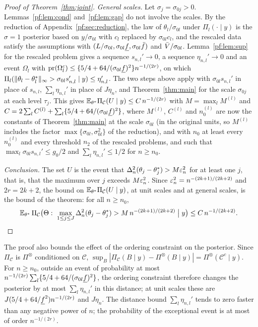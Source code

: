 \begin{proof}[Proof of Theorem~\ref{thm:joint}]
\emph{General scales.} Let $\sigma_j=\sigma_{0j}>0$. Lemmas~\ref{pf:lem:cond} and~\ref{pf:lem:gap} do not involve the scales. By the reduction of Appendix~\ref{pf:sec:reduction}, the law of $\theta_l/\sigma_{0l}$ under $\Pi_l(\cdot\mid y)$ is the $\sigma=1$ posterior based on $y/\sigma_{0l}$ with $c_l$ replaced by $\sigma_{0l}c_l$, and the rescaled data satisfy the assumptions with $(L/\sigma_{0l},\sigma_{0l}\underline f,\sigma_{0l}\bar f)$ and $\bar V/\sigma_{0l}$. Lemma~\ref{pf:lem:sup} for the rescaled problem gives a sequence $s_{n,l}'\to0$, a sequence $\eta_{n,l}'\to0$ and an event $\Omega_l$ with $\mathrm{pr}(\Omega_l^c)\le\{5/4+64/(\sigma_{0l}\underline f)^2\}n^{-1/(2r)}$, on which $\Pi_l(\|\theta_l-\theta^{*}_l\|_\infty>\sigma_{0l}s_{n,l}'\mid y)\le\eta_{n,l}'$. The two steps above apply with $\sigma_{0l}s_{n,l}'$ in place of $s_{n,l}$, $\sum_l\eta_{n,l}'$ in place of $J\eta_n$, and Theorem~\ref{thm:main} for the scale $\sigma_{0j}$ at each level $\tau_j$. This gives $\mathbb{E}_{\theta^{*}}\Pi_{\mathcal C}(U\mid y)\le C\,n^{-1/(2r)}$ with $M=\max_lM^{(l)}$ and $C=2\sum_lC^{(l)}+\sum_l\{5/4+64/(\sigma_{0l}\underline f)^2\}$, where $M^{(l)}$, $C^{(l)}$ and $n_0^{(l)}$ are now the constants of Theorem~\ref{thm:main} at the scale $\sigma_{0l}$ (in the original units, so $M^{(l)}$ includes the factor $\max\{\sigma_{0l},\sigma_{0l}^2\}$ of the reduction), and with $n_0$ at least every $n_0^{(l)}$ and every threshold $n_2$ of the rescaled problems, and such that $\max_l\sigma_{0l}s_{n,l}'\le g_0/2$ and $\sum_l\eta_{n,l}'\le1/2$ for $n\ge n_0$.

\emph{Conclusion.} The set $U$ is the event that $\Delta_n^2(\theta_j-\theta^{*}_j)>M\varepsilon_n^2$ for at least one $j$, that is, that the maximum over $j$ exceeds $M\varepsilon_n^2$. Since $\varepsilon_n^2=n^{-(2k+1)/(2k+2)}$ and $2r=2k+2$, the bound on $\mathbb{E}_{\theta^{*}}\Pi_{\mathcal C}(U\mid y)$, at unit scales and at general scales, is the bound of the theorem: for all $n\ge n_0$,
\[
\mathbb{E}_{\theta^{*}}\,\Pi_{\mathcal C}\bigl(\Theta:\ \max_{1\le j\le J}\Delta_n^2(\theta_j-\theta^{*}_j)>M\,n^{-(2k+1)/(2k+2)}\bigm|y\bigr)\le C\,n^{-1/(2k+2)}. \qedhere
\]
\end{proof}

The proof also bounds the effect of the ordering constraint on the posterior. Since $\Pi_{\mathcal C}$ is $\Pi^{\otimes}$ conditioned on $\mathcal C$, $\sup_B|\Pi_{\mathcal C}(B\mid y)-\Pi^{\otimes}(B\mid y)|=\Pi^{\otimes}(\mathcal C^c\mid y)$. For $n\ge n_0$, outside an event of probability at most $n^{-1/(2r)}\sum_l\{5/4+64/(\sigma_{0l}\underline f)^2\}$, the ordering constraint therefore changes the posterior by at most $\sum_l\eta_{n,l}'$ in this distance; at unit scales these are $J(5/4+64/\underline f^2)n^{-1/(2r)}$ and $J\eta_n$. The distance bound $\sum_l\eta_{n,l}'$ tends to zero faster than any negative power of $n$; the probability of the exceptional event is at most of order $n^{-1/(2r)}$.
